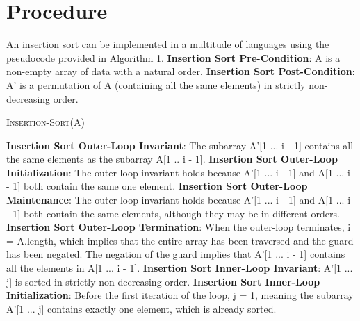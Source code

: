 \documentclass[onecolumn, 12pt, article]{IEEEtran}
\numberwithin{case}{problem}
\numberwithin{condition}{problem}
\numberwithin{condition}{subsection}
\numberwithin{definition}{section}
\theoremstyle{remark}
\numberwithin{question}{problem}
\theoremstyle{plain}
\numberwithin{answer}{problem}
\numberwithin{solution}{section}
\numberwithin{equation}{section}%
\begin{document}
\section{Procedure}
An insertion sort can be implemented in a multitude of languages using the pseudocode provided in Algorithm 1.
\newline
\textbf{Insertion Sort Pre-Condition}: A is a non-empty array of data with a natural order.
\newline
\textbf{Insertion Sort Post-Condition}: A' is a permutation of A (containing all the same elements) in strictly non-decreasing order.
\begin{algorithm}
\caption {\textsc{Insertion-Sort}(A)}
\label{algo:insertionsort}
\begin{algorithmic}[1]
\EndIf
{}
	\EndWhile
\EndWhile
{}
\EndProcedure
\end{algorithmic}
\end{algorithm}
\newline
\textbf{Insertion Sort Outer-Loop Invariant}: The subarray A'[1 ... i - 1] contains all the same elements as the subarray A[1 .. i - 1].
\newline 
\textbf{Insertion Sort Outer-Loop Initialization}: The outer-loop invariant holds because A'[1 ... i - 1] and A[1 ... i - 1] both contain the same one element.
\newline
\textbf{Insertion Sort Outer-Loop Maintenance}: The outer-loop invariant holds because A'[1 ... i - 1] and A[1 ... i - 1] both contain the same elements, although they may be in different orders.
\newline
\textbf{Insertion Sort Outer-Loop Termination}: When the outer-loop terminates, i = A.length, which implies that the entire array has been traversed and the guard has been negated. The negation of the guard implies that A'[1 ... i - 1] contains all the elements in A[1 ... i - 1].
\newline
\newline
\textbf{Insertion Sort Inner-Loop Invariant}: A'[1 ... j] is sorted in strictly non-decreasing order.
\newline
\textbf{Insertion Sort Inner-Loop Initialization}: Before the first iteration of the loop, j = 1, meaning the subarray A'[1 ... j] contains exactly one element, which is already sorted.
\end{document}
